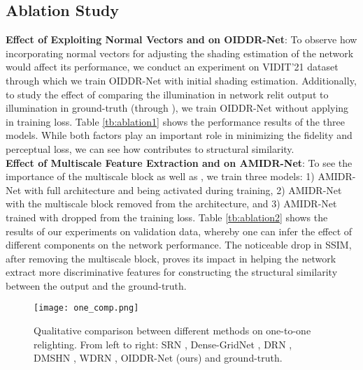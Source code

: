 \documentclass[final]{cvpr}
\newcommand{\smallsqueezeup}{\vspace{-2mm}}
\begin{document}
\subsection{Ablation Study}
\textbf{Effect of Exploiting Normal Vectors and  on OIDDR-Net}:
To observe how incorporating normal vectors for adjusting the shading estimation of the network would affect its performance, we conduct an experiment on VIDIT'21 dataset through which we train OIDDR-Net with initial shading estimation. Additionally, to study the effect of comparing the illumination in network relit output to illumination in ground-truth (through ), we train OIDDR-Net without applying  in training loss. Table \ref{tb:ablation1} shows the performance results of the three models. While both factors play an important role in minimizing the fidelity and perceptual loss, we can see how  contributes to structural similarity.\\
\textbf{Effect of Multiscale Feature Extraction and  on AMIDR-Net}: To see the importance of the multiscale block as well as , we train three models: 1) AMIDR-Net with full architecture and  being activated during training, 2) AMIDR-Net with the multiscale block removed from the architecture, and 3) AMIDR-Net trained with  dropped from the training loss. Table \ref{tb:ablation2} shows the results of our experiments on validation data, whereby one can infer the effect of different components on the network performance. The noticeable drop in SSIM, after removing the multiscale block, proves its impact in helping the network extract more discriminative features for constructing the structural similarity between the output and the ground-truth.
\begin{table}[]
\caption{Any-to-any-VIDIT'21 validation's ablation study.}
\smallsqueezeup
\label{tb:ablation2}
    \centering
{}
    \smallsqueezeup
\end{table}
\begin{figure*}[h]
    \centering
    \texttt{[image: one\_comp.png]}\smallsqueezeup\vspace{-1mm}
    \caption{Qualitative comparison between different methods on one-to-one relighting. From left to right: SRN \cite{53}, Dense-GridNet \cite{54}, DRN \cite{11}, DMSHN \cite{55}, WDRN \cite{14}, OIDDR-Net (ours) and ground-truth.  }\smallsqueezeup
    \label{fig:comp1}
    \smallsqueezeup
\end{figure*}
\end{document}
